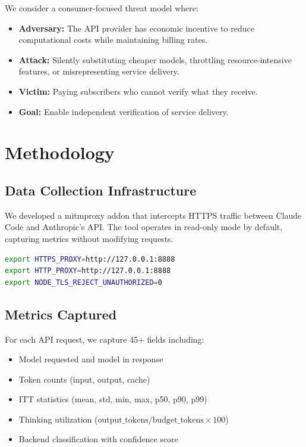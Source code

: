 \documentclass[11pt,a4paper]{article}
\begin{document}
We consider a consumer-focused threat model where:
\begin{itemize}
    \item \textbf{Adversary:} The API provider has economic incentive to reduce computational costs while maintaining billing rates.
    \item \textbf{Attack:} Silently substituting cheaper models, throttling resource-intensive features, or misrepresenting service delivery.
    \item \textbf{Victim:} Paying subscribers who cannot verify what they receive.
    \item \textbf{Goal:} Enable independent verification of service delivery.
\end{itemize}

\section{Methodology}

\subsection{Data Collection Infrastructure}

We developed a mitmproxy addon that intercepts HTTPS traffic between Claude Code and Anthropic's API. The tool operates in read-only mode by default, capturing metrics without modifying requests.

\begin{lstlisting}[language=bash,caption=Environment Configuration]
export HTTPS_PROXY=http://127.0.0.1:8888
export HTTP_PROXY=http://127.0.0.1:8888
export NODE_TLS_REJECT_UNAUTHORIZED=0
\end{lstlisting}

\subsection{Metrics Captured}

For each API request, we capture 45+ fields including:
\begin{itemize}
    \item Model requested and model in response
    \item Token counts (input, output, cache)
    \item ITT statistics (mean, std, min, max, p50, p90, p99)
    \item Thinking utilization ($\text{output\_tokens} / \text{budget\_tokens} \times 100$)
    \item Backend classification with confidence score
\end{itemize}
\end{document}
